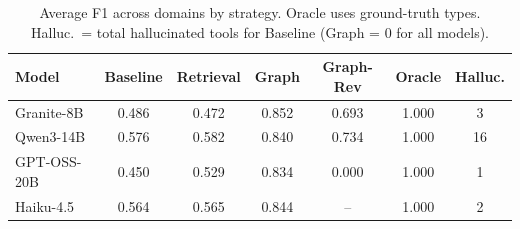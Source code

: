 \begin{table}[t]
\centering
\small
\begin{tabular}{l cccccc}
\toprule
\textbf{Model} & \textbf{Baseline} & \textbf{Retrieval} & \textbf{Graph} & \textbf{Graph-Rev} & \textbf{Oracle} & \textbf{Halluc.} \\
\midrule
Granite-8B & 0.486 & 0.472 & 0.852 & 0.693 & 1.000 & 3 \\
Qwen3-14B & 0.576 & 0.582 & 0.840 & 0.734 & 1.000 & 16 \\
GPT-OSS-20B & 0.450 & 0.529 & 0.834 & 0.000 & 1.000 & 1 \\
Haiku-4.5 & 0.564 & 0.565 & 0.844 & -- & 1.000 & 2 \\
\bottomrule
\end{tabular}
\caption{Average F1 across domains by strategy. Oracle uses ground-truth types. Halluc.\ = total hallucinated tools for Baseline (Graph = 0 for all models).}
\label{tab:strategy-comparison}
\end{table}